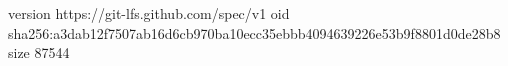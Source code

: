 version https://git-lfs.github.com/spec/v1
oid sha256:a3dab12f7507ab16d6cb970ba10ecc35ebbb4094639226e53b9f8801d0de28b8
size 87544
